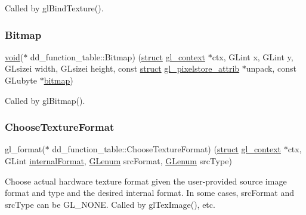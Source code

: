 Called by gl\+Bind\+Texture(). \mbox{\label{structdd__function__table_a438e3b6bcb20c0503c6e45565e1b416a}} 
\subsubsection{\texorpdfstring{Bitmap}{Bitmap}}
{\footnotesize\ttfamily \hyperlink{interfacevoid}{void}($\ast$ dd\+\_\+function\+\_\+table\+::\+Bitmap) (\hyperlink{interfacestruct}{struct} \hyperlink{structgl__context}{gl\+\_\+context} $\ast$ctx, G\+Lint x, G\+Lint y, G\+Lsizei width, G\+Lsizei height, const \hyperlink{interfacestruct}{struct} \hyperlink{structgl__pixelstore__attrib}{gl\+\_\+pixelstore\+\_\+attrib} $\ast$unpack, const G\+Lubyte $\ast$\hyperlink{structbitmap}{bitmap})}

Called by gl\+Bitmap(). \mbox{\label{structdd__function__table_ab3029e9747f5413c4e33efb89c245462}} 
\subsubsection{\texorpdfstring{Choose\+Texture\+Format}{ChooseTextureFormat}}
{\footnotesize\ttfamily gl\+\_\+format($\ast$ dd\+\_\+function\+\_\+table\+::\+Choose\+Texture\+Format) (\hyperlink{interfacestruct}{struct} \hyperlink{structgl__context}{gl\+\_\+context} $\ast$ctx, G\+Lint \hyperlink{interfacevoid}{internal\+Format}, \hyperlink{interfacevoid}{G\+Lenum} src\+Format, \hyperlink{interfacevoid}{G\+Lenum} src\+Type)}

Choose actual hardware texture format given the user-\/provided source image format and type and the desired internal format. In some cases, src\+Format and src\+Type can be G\+L\+\_\+\+N\+O\+NE. Called by gl\+Tex\+Image(), etc. \mbox{\label{structdd__function__table_a5ff278dbc44c864bab3d198b40f0cff9}} 
